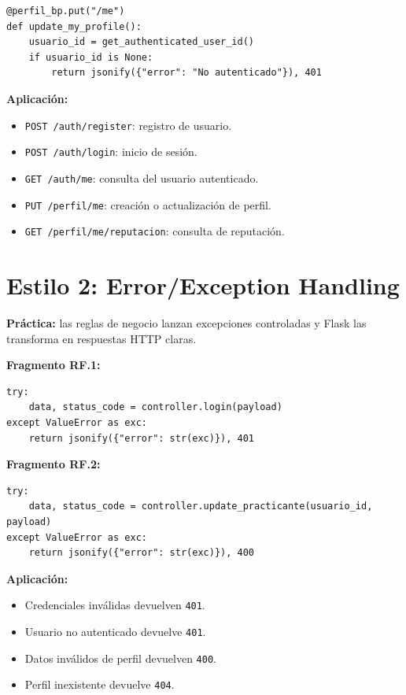 \documentclass[12pt,a4paper]{article}
\begin{document}
\begin{lstlisting}[style=pythonstyle]
@perfil_bp.put("/me")
def update_my_profile():
    usuario_id = get_authenticated_user_id()
    if usuario_id is None:
        return jsonify({"error": "No autenticado"}), 401
\end{lstlisting}

\textbf{Aplicación:}

\begin{itemize}
    \item \texttt{POST /auth/register}: registro de usuario.
    \item \texttt{POST /auth/login}: inicio de sesión.
    \item \texttt{GET /auth/me}: consulta del usuario autenticado.
    \item \texttt{PUT /perfil/me}: creación o actualización de perfil.
    \item \texttt{GET /perfil/me/reputacion}: consulta de reputación.
\end{itemize}

\section{Estilo 2: Error/Exception Handling}

\textbf{Práctica:} las reglas de negocio lanzan excepciones controladas y Flask las transforma en respuestas HTTP claras.

\textbf{Fragmento RF.1:}

\begin{lstlisting}[style=pythonstyle]
try:
    data, status_code = controller.login(payload)
except ValueError as exc:
    return jsonify({"error": str(exc)}), 401
\end{lstlisting}

\textbf{Fragmento RF.2:}

\begin{lstlisting}[style=pythonstyle]
try:
    data, status_code = controller.update_practicante(usuario_id, payload)
except ValueError as exc:
    return jsonify({"error": str(exc)}), 400
\end{lstlisting}

\textbf{Aplicación:}

\begin{itemize}
    \item Credenciales inválidas devuelven \texttt{401}.
    \item Usuario no autenticado devuelve \texttt{401}.
    \item Datos inválidos de perfil devuelven \texttt{400}.
    \item Perfil inexistente devuelve \texttt{404}.
\end{itemize}
\end{document}
